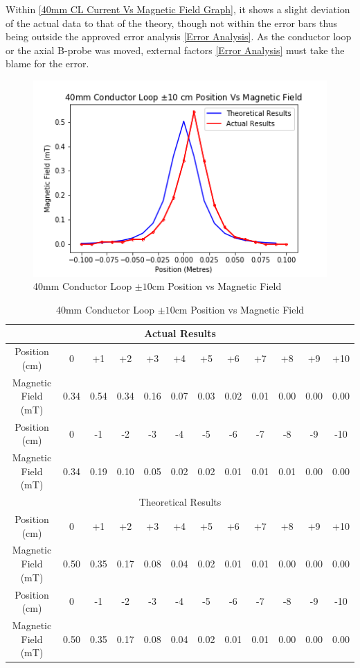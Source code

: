 \documentclass[12pt]{article}
\begin{document}
Within \cref{40mm CL Current Vs Magnetic Field Graph}, it shows a slight deviation of the actual data to that of the theory, though not within the error bars thus being outside the approved error analysis \cref{Error Analysis}. As the conductor loop or the axial B-probe was moved, external factors \cref{Error Analysis} must take the blame for the error. 

\begin{figure}[H]
\centering
\includegraphics[scale=0.7]{Images/Conductors/40mm_CL_Position(cm)_Vs_Magnetic_Field_Graph.png}
\caption{40mm Conductor Loop $\pm10$cm Position vs Magnetic Field}
\label{40mm CL Positon Vs Magnetic Field Graph}
\end{figure}

\begin{table}[H]
\begin{center}
 \footnotesize
 \begin{tabular}{|c||c|c|c|c|c|c|c|c|c|c|c|}
 \hline
 \multicolumn{12}{|c|}{Actual Results} \\
 \hline
 Position (cm) & 0 & +1 & +2 & +3 & +4 & +5 & +6 & +7 & +8 & +9 & +10 \\
 \hline
 Magnetic Field (mT) & 0.34 & 0.54 & 0.34 & 0.16 & 0.07 & 0.03 & 0.02 & 0.01 & 0.00 & 0.00 & 0.00 \\
 \hline \hline
 Position (cm) & 0 & -1 & -2 & -3 & -4 & -5 & -6 & -7 & -8 & -9 & -10 \\
 \hline
 Magnetic Field (mT) & 0.34 & 0.19 & 0.10 & 0.05 & 0.02 & 0.02 & 0.01 & 0.01 & 0.01 & 0.00 & 0.00 \\
 \hline
 \hline
 \multicolumn{12}{|c|}{Theoretical Results} \\
 \hline
  Position (cm) & 0 & +1 & +2 & +3 & +4 & +5 & +6 & +7 & +8 & +9 & +10 \\
 \hline
 Magnetic Field (mT) & 0.50 & 0.35 & 0.17 & 0.08 & 0.04 & 0.02 & 0.01 & 0.01 & 0.00 & 0.00 & 0.00 \\
 \hline \hline
 Position (cm) & 0 & -1 & -2 & -3 & -4 & -5 & -6 & -7 & -8 & -9 & -10 \\
 \hline
 Magnetic Field (mT) & 0.50 & 0.35 & 0.17 & 0.08 & 0.04 & 0.02 & 0.01 & 0.01 & 0.00 & 0.00 & 0.00 \\
 \hline
 \end{tabular}
 \caption{40mm Conductor Loop $\pm10$cm Position vs Magnetic Field}
 \label{40mm CL Postion Vs Magnetic Field Table}
\end{center}
\end{table}
\end{document}

